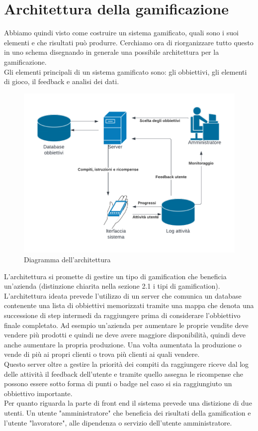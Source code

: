\chapter{Architettura della gamificazione}
Abbiamo quindi visto come costruire un sistema gamificato, quali sono i suoi elementi e che risultati può produrre. Cerchiamo ora di riorganizzare tutto questo in uno schema disegnando in generale una possibile architettura per la gamificazione.\\
Gli elementi principali di un sistema gamificato sono: gli obbiettivi, gli elementi di gioco, il feedback e analisi dei dati.

\begin{figure}[h!]
  \centerline{\includegraphics[angle=0]{figures/architettura.pdf}}
  \caption{Diagramma dell'architettura}
\end{figure}

L'architettura si promette di gestire un tipo di gamification che beneficia un'azienda (distinzione chiarita nella sezione 2.1 i tipi di gamification).
L'architettura ideata prevede l'utilizzo di un server che comunica un database contenente una lista di obbiettivi memorizzati tramite una mappa che denota una successione di step intermedi da raggiungere prima di considerare l'obbiettivo finale completato. Ad esempio un'azienda per aumentare le proprie vendite deve vendere più prodotti e quindi ne deve avere maggiore disponibilità, quindi deve anche aumentare la propria produzione. Una volta aumentata la produzione o vende di più ai propri clienti o trova più clienti ai quali vendere.\\
Questo server oltre a gestire la priorità dei compiti da raggiungere riceve dal log delle attività il feedback dell'utente e tramite quello assegna le ricompense che possono essere sotto forma di punti o badge nel caso si sia raggiungiuto un obbiettivo importante. \\
Per quanto riguarda la parte di front end il sistema prevede una distizione di due utenti. Un utente "amministratore" che beneficia dei risultati della gamification e l'utente "lavoratore", alle dipendenza o servizio dell'utente amministratore.

